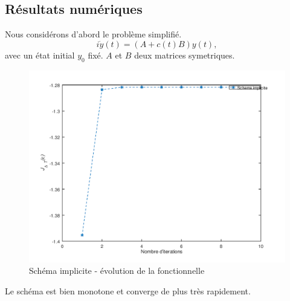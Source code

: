 \subsection{Résultats numériques}
Nous considérons d'abord le problème simplifié.
\begin{equation}
i\dot y(t)= (A+c(t)B)y(t),
\end{equation}
avec un état initial $y_0$ fixé. $A$ et $B$ deux matrices symetriques.\\
\begin{figure}[H]
	\caption{Schéma implicite - évolution de la fonctionnelle}
	\centering
	\includegraphics[scale=0.7]{images/implicit_func.png}
\end{figure}
Le schéma est bien monotone et converge de plus très rapidement.

